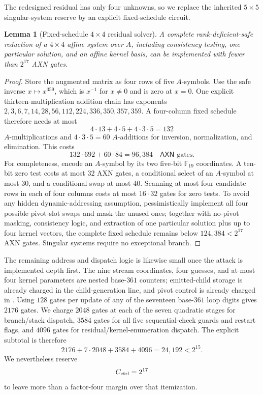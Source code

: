 \documentclass[11pt]{article}
\newtheorem{lemma}[theorem]{Lemma}
\newcommand{\F}{\mathbb F}
\newcommand{\AXN}{\mathsf{AXN}}
\begin{document}
The redesigned residual has only four unknowns, so we replace the inherited
$5\times5$ singular-system reserve by an explicit fixed-schedule circuit.

\begin{lemma}[Fixed-schedule $4\times4$ residual solver]
\label{lem:jg-rref4}
A complete rank-deficient-safe reduction of a $4\times4$ affine system over
$A$, including consistency testing, one particular solution, and an affine
kernel basis, can be implemented with fewer than $2^{17}$ AXN gates.
\end{lemma}

\begin{proof}
Store the augmented matrix as four rows of five $A$-symbols.  Use the safe
inverse $x\mapsto x^{359}$, which is $x^{-1}$ for $x\ne0$ and is zero at
$x=0$.  One explicit thirteen-multiplication addition chain has exponents
$2,3,6,7,14,28,56,112,224,336,350,357,359$.  A four-column fixed schedule
therefore needs at most
\[
 4\cdot13+4\cdot5+4\cdot3\cdot5=132
\]
$A$-multiplications and $4\cdot3\cdot5=60$ $A$-additions for inversion,
normalization, and elimination.  This costs
\[
 132\cdot692+60\cdot84=96{,}384\quad\AXN\text{ gates}.
\]
For completeness, encode an $A$-symbol by its two five-bit $\F_{19}$
coordinates.  A ten-bit zero test costs at most $32$ AXN gates, a conditional
select of an $A$-symbol at most $30$, and a conditional swap at most $40$.
Scanning at most four candidate rows in each of four columns costs at most
$16\cdot32$ gates for zero tests.  To avoid any hidden dynamic-addressing
assumption, pessimistically implement all four possible pivot-slot swaps and
mask the unused ones; together with no-pivot masking, consistency logic, and
extraction of one particular solution plus up to four kernel vectors, the
complete fixed schedule remains below $124{,}384<2^{17}$ AXN gates.  Singular
systems require no exceptional branch.
\end{proof}

The remaining address and dispatch logic is likewise small once the attack is
implemented depth first.  The nine stream coordinates, four guesses, and at
most four kernel parameters are nested base-$361$ counters; emitted-child
storage is already charged in the child-generation line, and pivot control is
already charged in .  Using $128$ gates per update of any
of the seventeen base-$361$ loop digits gives $2176$ gates.  We charge $2048$
gates at each of the seven quadratic stages for branch/stack dispatch, $3584$
gates for all five sequential-check guards and restart flags, and $4096$ gates
for residual/kernel-enumeration dispatch.  The explicit subtotal is therefore
\[
 2176+7\cdot2048+3584+4096=24{,}192<2^{15}.
\]
We nevertheless reserve
\begin{equation}
 C_{\rm ctrl}=2^{17}                                \label{eq:jg-control-reserve}
\end{equation}
to leave more than a factor-four margin over that itemization.
\end{document}
